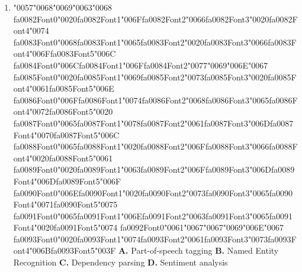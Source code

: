 \documentclass[11pt]{article}
\begin{document}
\begin{enumerate}[leftmargin=*]
    \textbf{A.} It produces too many tokens
    \textbf{B.} It does not work well for languages without explicit word boundaries
    \textbf{C.} It cannot tokenize English at all
    \textbf{D.} It ignores punctuation entirely

  \item {\char"0057}{\char"0068}{\char"0069}{\char"0063}{\char"0068} {\csname fa0082Font0\endcsname\char"0020}{\csname fa0082Font1\endcsname\char"006F}{\csname fa0082Font2\endcsname\char"0066}{\csname fa0082Font3\endcsname\char"0020}{\csname fa0082Font4\endcsname\char"0074} {\csname fa0083Font0\endcsname\char"0068}{\csname fa0083Font1\endcsname\char"0065}{\csname fa0083Font2\endcsname\char"0020}{\csname fa0083Font3\endcsname\char"0066}{\csname fa0083Font4\endcsname\char"006F}{\csname fa0083Font5\endcsname\char"006C} {\csname fa0084Font0\endcsname\char"006C}{\csname fa0084Font1\endcsname\char"006F}{\csname fa0084Font2\endcsname\char"0077}{\char"0069}{\char"006E}{\char"0067} {\csname fa0085Font0\endcsname\char"0020}{\csname fa0085Font1\endcsname\char"0069}{\csname fa0085Font2\endcsname\char"0073}{\csname fa0085Font3\endcsname\char"0020}{\csname fa0085Font4\endcsname\char"0061}{\csname fa0085Font5\endcsname\char"006E} {\csname fa0086Font0\endcsname\char"006F}{\csname fa0086Font1\endcsname\char"0074}{\csname fa0086Font2\endcsname\char"0068}{\csname fa0086Font3\endcsname\char"0065}{\csname fa0086Font4\endcsname\char"0072}{\csname fa0086Font5\endcsname\char"0020} {\csname fa0087Font0\endcsname\char"0065}{\csname fa0087Font1\endcsname\char"0078}{\csname fa0087Font2\endcsname\char"0061}{\csname fa0087Font3\endcsname\char"006D}{\csname fa0087Font4\endcsname\char"0070}{\csname fa0087Font5\endcsname\char"006C} {\csname fa0088Font0\endcsname\char"0065}{\csname fa0088Font1\endcsname\char"0020}{\csname fa0088Font2\endcsname\char"006F}{\csname fa0088Font3\endcsname\char"0066}{\csname fa0088Font4\endcsname\char"0020}{\csname fa0088Font5\endcsname\char"0061} {\csname fa0089Font0\endcsname\char"0020}{\csname fa0089Font1\endcsname\char"0063}{\csname fa0089Font2\endcsname\char"006F}{\csname fa0089Font3\endcsname\char"006D}{\csname fa0089Font4\endcsname\char"006D}{\csname fa0089Font5\endcsname\char"006F} {\csname fa0090Font0\endcsname\char"006E}{\csname fa0090Font1\endcsname\char"0020}{\csname fa0090Font2\endcsname\char"0073}{\csname fa0090Font3\endcsname\char"0065}{\csname fa0090Font4\endcsname\char"0071}{\csname fa0090Font5\endcsname\char"0075} {\csname fa0091Font0\endcsname\char"0065}{\csname fa0091Font1\endcsname\char"006E}{\csname fa0091Font2\endcsname\char"0063}{\csname fa0091Font3\endcsname\char"0065}{\csname fa0091Font4\endcsname\char"0020}{\csname fa0091Font5\endcsname\char"0074} {\csname fa0092Font0\endcsname\char"0061}{\char"0067}{\char"0067}{\char"0069}{\char"006E}{\char"0067} {\csname fa0093Font0\endcsname\char"0020}{\csname fa0093Font1\endcsname\char"0074}{\csname fa0093Font2\endcsname\char"0061}{\csname fa0093Font3\endcsname\char"0073}{\csname fa0093Font4\endcsname\char"006B}{\csname fa0093Font5\endcsname\char"003F}
    \textbf{A.} Part-of-speech tagging
    \textbf{B.} Named Entity Recognition
    \textbf{C.} Dependency parsing
    \textbf{D.} Sentiment analysis


\end{enumerate}
\end{document}
